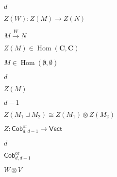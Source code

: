 \begin{preview}
\setcounter{equation}{0}%
\( d \)
\end{preview}

\begin{preview}
\setcounter{equation}{0}%
\( Z(W) : Z(M) \to Z(N) \)
\end{preview}

\begin{preview}
\setcounter{equation}{0}%
\( M \xrightarrow{W}  N \)
\end{preview}

\begin{preview}
\setcounter{equation}{0}%
\( Z(M) \in \operatorname*{Hom}( \mathbf{C} , \mathbf{C}) \)
\end{preview}

\begin{preview}
\setcounter{equation}{0}%
\( M \in \operatorname*{Hom}(\emptyset , \emptyset) \)
\end{preview}

\begin{preview}
\setcounter{equation}{0}%
\( d \)
\end{preview}

\begin{preview}
\setcounter{equation}{0}%
\( Z(M) \)
\end{preview}

\begin{preview}
\setcounter{equation}{0}%
\( d-1 \)
\end{preview}

\begin{preview}
\setcounter{equation}{0}%
\( Z( M_1\sqcup M_2) \cong Z(M_1) \otimes Z(M_2) \)
\end{preview}

\begin{preview}
\setcounter{equation}{0}%
\( Z : \mathsf{Cob}_{d,d-1}^{\mathrm{or}} \to \mathsf{Vect} \)
\end{preview}

\begin{preview}
\setcounter{equation}{0}%
\( d \)
\end{preview}

\begin{preview}
\setcounter{equation}{0}%
\( \mathsf{Cob}_{d,d-1}^{\mathrm{or}} \)
\end{preview}

\begin{preview}
\setcounter{equation}{0}%
\( W \otimes  V \)
\end{preview}

